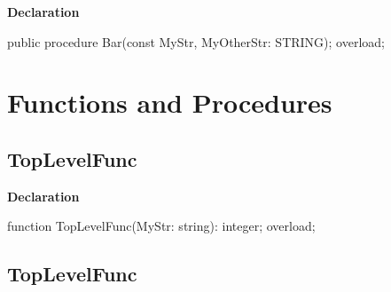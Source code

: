 \documentclass{report}
\newif\ifpdf
\begin{document}
\label{ok_link_tag_overloads.TOverloadedMethods-Bar}
\begin{list}{}{
\setlength{\itemindent}{0cm}
\setlength{\listparindent}{0cm}
\setlength{\leftmargin}{\evensidemargin}
\addtolength{\leftmargin}{\tmplength}
\settowidth{\labelsep}{X}
\addtolength{\leftmargin}{\labelsep}
\setlength{\labelwidth}{\tmplength}
}
\item[\textbf{Declaration}\hfill]
\ifpdf
\begin{flushleft}
\fi
\begin{ttfamily}
public procedure Bar(const MyStr, MyOtherStr: STRING); overload;\end{ttfamily}

\ifpdf
\end{flushleft}
\fi

\end{list}
\section{Functions and Procedures}
\ifpdf
\subsection*{\large{\textbf{TopLevelFunc}}\normalsize\hspace{1ex}\hrulefill}
\else
\subsection*{TopLevelFunc}
\fi
\label{ok_link_tag_overloads-TopLevelFunc}
\begin{list}{}{
\setlength{\itemindent}{0cm}
\setlength{\listparindent}{0cm}
\setlength{\leftmargin}{\evensidemargin}
\addtolength{\leftmargin}{\tmplength}
\settowidth{\labelsep}{X}
\addtolength{\leftmargin}{\labelsep}
\setlength{\labelwidth}{\tmplength}
}
\item[\textbf{Declaration}\hfill]
\ifpdf
\begin{flushleft}
\fi
\begin{ttfamily}
function TopLevelFunc(MyStr: string): integer; overload;\end{ttfamily}

\ifpdf
\end{flushleft}
\fi

\end{list}
\ifpdf
\subsection*{\large{\textbf{TopLevelFunc}}\normalsize\hspace{1ex}\hrulefill}
\else
\end{document}
